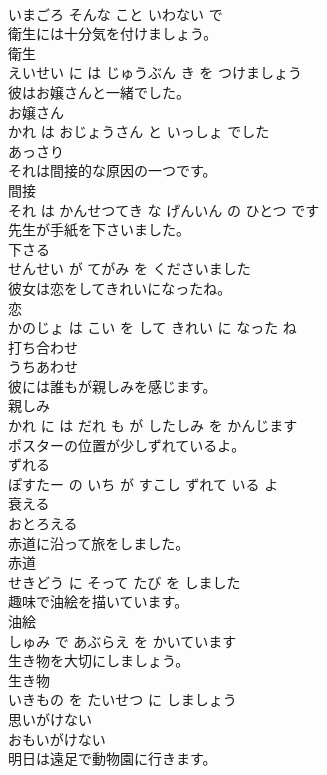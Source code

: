 \documentclass[8pt]{extreport}
\begin{document}
\begin{CJK}{UTF8}{min}
\\	いまごろ そんな こと いわない で			
\\	衛生には十分気を付けましょう。	
\\	衛生 
\\	えいせい に は じゅうぶん き を つけましょう			
\\	彼はお嬢さんと一緒でした。	
\\	お嬢さん 
\\	かれ は おじょうさん と いっしょ でした			
\\	あっさり	
\\	それは間接的な原因の一つです。	
\\	間接 
\\	それ は かんせつてき な げんいん の ひとつ です			
\\	先生が手紙を下さいました。	
\\	下さる 
\\	せんせい が てがみ を くださいました			
\\	彼女は恋をしてきれいになったね。	
\\	恋 
\\	かのじょ は こい を して きれい に なった ね			
\\	打ち合わせ	
\\	うちあわせ			
\\	彼には誰もが親しみを感じます。	
\\	親しみ 
\\	かれ に は だれ も が したしみ を かんじます			
\\	ポスターの位置が少しずれているよ。	
\\	ずれる 
\\	ぽすたー の いち が すこし ずれて いる よ			
\\	衰える	
\\	おとろえる			
\\	赤道に沿って旅をしました。	
\\	赤道 
\\	せきどう に そって たび を しました			
\\	趣味で油絵を描いています。	
\\	油絵 
\\	しゅみ で あぶらえ を かいています			
\\	生き物を大切にしましょう。	
\\	生き物 
\\	いきもの を たいせつ に しましょう			
\\	思いがけない	
\\	おもいがけない			
\\	明日は遠足で動物園に行きます。	

\end{CJK}
\end{document}
